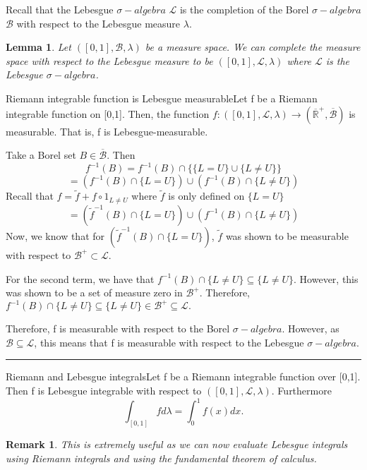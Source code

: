\documentclass[twoside]{article}
\newtheorem{lemma}[theorem]{Lemma}
\newtheorem{remark}[theorem]{Remark}
\newenvironment{proof}{{\bf Proof:}}{\hfill\rule{2mm}{2mm}}
\newcommand{\borelsigmaalgebra}{\mathcal{B}}
\newcommand{\sa}{\sigma-algebra}
\newcommand{\positiveextendedreal}{\overline{\mathbb{R}}^+}
\begin{document}
Recall that the Lebesgue $\sa$ $\mathcal{L}$ is the completion of the Borel $\sa$ $\borelsigmaalgebra$ with respect to the Lebesgue measure $\lambda.$
\begin{lemma}Let $([0,1], \borelsigmaalgebra, \lambda)$ be a measure space. We can complete the measure space with respect to the Lebesgue measure to be $([0,1], \mathcal{L}, \lambda)$ where $\mathcal{L}$ is the Lebesgue $\sa$.
\end{lemma}

\begin{theorem_exam}{Riemann integrable function is Lebesgue measurable}{}Let f be a Riemann integrable function on [0,1]. Then, the function $f: ([0,1], \mathcal{L}, \lambda) \rightarrow (\positiveextendedreal, \overline{\borelsigmaalgebra})$ is measurable. That is, f is Lebesgue-measurable.
\end{theorem_exam}

\begin{proof} Take a Borel set $B \in \overline{\borelsigmaalgebra}.$ Then 
$$
f^{-1}(B) = f^{-1}(B) \cap \{\{L = U\} \cup \{L \neq U\}\}
$$
$$
= (f^{-1}(B) \cap \{L = U\}) \cup (f^{-1}(B) \cap \{L \neq U\})
$$
Recall that $f = \tilde{f} + f\circ 1_{L \neq U}$ where $\tilde{f}$ is only defined on $\{L = U\}$
$$
= (\tilde{f}^{-1}(B) \cap \{L = U\}) \cup (f^{-1}(B) \cap \{L \neq U\})
$$
Now, we know that for $(\tilde{f}^{-1}(B) \cap \{L = U\})$, $\tilde{f}$ was shown to be measurable with respect to $\borelsigmaalgebra^+ \subset \mathcal{L}.$

For the second term, we have that $f^{-1}(B) \cap \{L \neq U\} \subseteq \{L \neq U\}$. However, this was shown to be a set of measure zero in $\borelsigmaalgebra^+.$ Therefore, $f^{-1}(B) \cap \{L \neq U\} \subseteq \{L \neq U\} \in \borelsigmaalgebra^+ \subseteq \mathcal{L}.$

Therefore, f is measurable with respect to the Borel $\sa$. However, as $\borelsigmaalgebra \subseteq \mathcal{L}$, this means that f is measurable with respect to the Lebesgue $\sa.$
\end{proof}

\begin{theorem_exam}{Riemann and Lebesgue integrals}{}Let f be a Riemann integrable function over [0,1]. Then f is Lebesgue integrable with respect to $([0,1], \mathcal{L}, \lambda)$. Furthermore 
$$
\int_{[0,1]}fd\lambda = \int_{0}^{1}f(x)dx.
$$
\end{theorem_exam}

\begin{remark}This is extremely useful as we can now evaluate Lebesgue integrals using Riemann integrals and using the fundamental theorem of calculus.
\end{remark}
\end{document}
